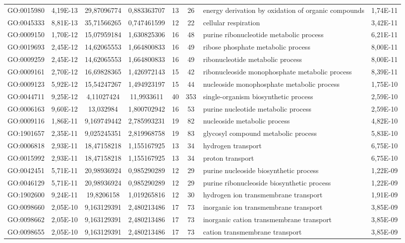 \documentclass[12pt, a4paper]{report}
\begin{document}
\begin{table}[H]
\begin{tabular}{c|c|c|c|c|c|p{4cm}|c}
GO:0015980&	4,19E-13&	29,87096774&	0,883363707&	13&	26&	energy derivation by oxidation of organic compounds&	1,74E-11\\
GO:0045333&	8,81E-13&	35,71566265&	0,747461599&	12&	22&	cellular respiration&	3,42E-11\\
GO:0009150&	1,70E-12&	15,07959184&	1,630825306&	16&	48&	purine ribonucleotide metabolic process&	6,21E-11\\
GO:0019693&	2,45E-12&	14,62065553&	1,664800833&	16&	49&	ribose phosphate metabolic process&	8,00E-11\\
GO:0009259&	2,45E-12&	14,62065553&	1,664800833&	16&	49&	ribonucleotide metabolic process&	8,00E-11\\
GO:0009161&	2,70E-12&	16,69828365&	1,426972143&	15&	42&	ribonucleoside monophosphate metabolic process&	8,39E-11\\
GO:0009123&	5,92E-12&	15,54247267&	1,494923197&	15&	44&	nucleoside monophosphate metabolic process&	1,75E-10\\
GO:0044711&	9,25E-12&	4,11027424&	11,9933611&	40&	353&	single-organism biosynthetic process&	2,59E-10\\
GO:0006163&	9,60E-12&	13,032984&	1,800702942&	16&	53&	purine nucleotide metabolic process&	2,59E-10\\
GO:0009116&	1,86E-11&	9,169749442&	2,785993231&	19&	82&	nucleoside metabolic process&	4,82E-10\\
GO:1901657&	2,35E-11&	9,025245351&	2,819968758&	19&	83&	glycosyl compound metabolic process&	5,83E-10\\
GO:0006818&	2,93E-11&	18,47158218&	1,155167925&	13&	34&	hydrogen transport&	6,75E-10\\
GO:0015992&	2,93E-11&	18,47158218&	1,155167925&	13&	34&	proton transport&	6,75E-10\\
GO:0042451&	5,71E-11&	20,98936924&	0,985290289&	12&	29&	purine nucleoside biosynthetic process&	1,22E-09\\
GO:0046129&	5,71E-11&	20,98936924&	0,985290289&	12&	29&	purine ribonucleoside biosynthetic process&	1,22E-09\\
GO:1902600&	9,24E-11&	19,8206158&	1,019265816&	12&	30&	hydrogen ion transmembrane transport&	1,91E-09\\
GO:0098660&	2,05E-10&	9,163129391&	2,480213486&	17&	73&	inorganic ion transmembrane transport&	3,85E-09\\
GO:0098662&	2,05E-10&	9,163129391&	2,480213486&	17&	73&	inorganic cation transmembrane transport&	3,85E-09\\
GO:0098655&	2,05E-10&	9,163129391&	2,480213486&	17&	73&	cation transmembrane transport&	3,85E-09\\

\end{tabular}
\end{table}
\end{document}
